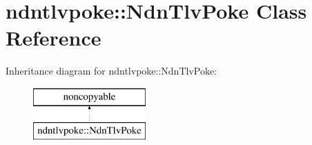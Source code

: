 \hypertarget{classndntlvpoke_1_1NdnTlvPoke}{}\section{ndntlvpoke\+:\+:Ndn\+Tlv\+Poke Class Reference}
\label{classndntlvpoke_1_1NdnTlvPoke}
Inheritance diagram for ndntlvpoke\+:\+:Ndn\+Tlv\+Poke\+:\begin{figure}[H]
\begin{center}
\leavevmode
\includegraphics[height=2.000000cm]{classndntlvpoke_1_1NdnTlvPoke}
\end{center}
\end{figure}
